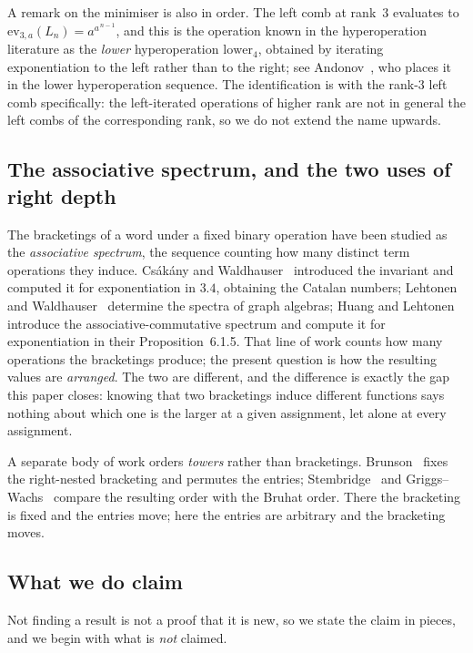 \documentclass[11pt,a4paper]{article}
\theoremstyle{plain}
\theoremstyle{definition}
\newcommand{\ev}{\mathrm{ev}}
\begin{document}
A remark on the minimiser is also in order. The left comb at rank~$3$ evaluates to
$\ev_{3,a}(L_n)=a^{a^{\,n-1}}$, and this is the operation known in the
hyperoperation literature as the \emph{lower} hyperoperation $\mathrm{lower}_4$,
obtained by iterating exponentiation to the left rather than to the right; see
Andonov~\cite{And}, who places it in the lower hyperoperation sequence. The
identification is with the rank-$3$ left comb specifically: the left-iterated
operations of higher rank are not in general the left combs of the corresponding
rank, so we do not extend the name upwards.

\subsection{The associative spectrum, and the two uses of right depth}

The bracketings of a word under a fixed binary operation have been studied as the
\emph{associative spectrum}, the sequence counting how many distinct term operations
they induce. Cs\'ak\'any and Waldhauser~\cite{CsW} introduced the invariant and computed
it for exponentiation in $3.4$, obtaining the Catalan numbers; Lehtonen and
Waldhauser~\cite{LW} determine the spectra of graph algebras; Huang and
Lehtonen~\cite{HL} introduce the associative-commutative spectrum and compute it for
exponentiation in their Proposition~6.1.5. That line of work counts how many operations
the bracketings produce; the present question is how the resulting values are
\emph{arranged}. The two are different, and the difference is exactly the gap this paper
closes: knowing that two bracketings induce different functions says nothing about which
one is the larger at a given assignment, let alone at every assignment.

A separate body of work orders \emph{towers} rather than bracketings.
Brunson~\cite{Bru} fixes the right-nested bracketing and permutes the entries;
Stembridge~\cite{Ste} and Griggs--Wachs~\cite{GW} compare the
resulting order with the Bruhat order. There the bracketing is fixed and the entries
move; here the entries are arbitrary and the bracketing moves.

\subsection{What we do claim}

Not finding a result is not a proof that it is new, so we state the claim in pieces,
and we begin with what is \emph{not} claimed.
\end{document}
